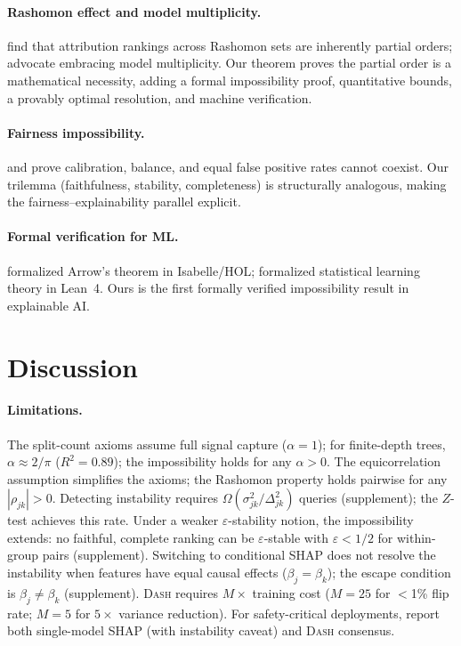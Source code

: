 \documentclass{article}
\newcommand{\DASH}{\textsc{Dash}}
\begin{document}
\paragraph{Rashomon effect and model multiplicity.}
\citet{laberge2023partial} find that attribution rankings across Rashomon sets are inherently partial orders; \citet{rudin2024amazing} advocate embracing model multiplicity.
Our theorem proves the partial order is a mathematical necessity, adding a formal impossibility proof, quantitative bounds, a provably optimal resolution, and machine verification.

\paragraph{Fairness impossibility.}
\citet{chouldechova2017fair} and \citet{kleinberg2017inherent} prove calibration, balance, and equal false positive rates cannot coexist.
Our trilemma (faithfulness, stability, completeness) is structurally analogous, making the fairness--explainability parallel explicit.

\paragraph{Formal verification for ML.}
\citet{nipkow2009social} formalized Arrow's theorem in Isabelle/HOL; \citet{zhang2026statistical} formalized statistical learning theory in Lean~4. Ours is the first formally verified impossibility result in explainable AI.

\section{Discussion}
\label{sec:discussion}

\paragraph{Limitations.}
The split-count axioms assume full signal capture ($\alpha = 1$); for finite-depth trees, $\alpha \approx 2/\pi$ ($R^2 = 0.89$); the impossibility holds for any $\alpha > 0$.
The equicorrelation assumption simplifies the axioms; the Rashomon property holds pairwise for any $|\rho_{jk}| > 0$.
Detecting instability requires $\Omega(\sigma^2_{jk}/\Delta^2_{jk})$ queries (supplement); the $Z$-test achieves this rate.
Under a weaker $\varepsilon$-stability notion, the impossibility extends: no faithful, complete ranking can be $\varepsilon$-stable with $\varepsilon < 1/2$ for within-group pairs (supplement).
Switching to conditional SHAP \citep{janzing2020feature} does not resolve the instability when features have equal causal effects ($\beta_j = \beta_k$); the escape condition is $\beta_j \neq \beta_k$ (supplement).
\DASH{} requires $M\times$ training cost ($M{=}25$ for $<$1\% flip rate; $M{=}5$ for $5\times$ variance reduction).
For safety-critical deployments, report both single-model SHAP (with instability caveat) and \DASH{} consensus.
\end{document}
